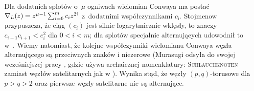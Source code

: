 Dla dodatnich splotów o~$\mu$ ogniwach wielomian Conwaya ma postać $\nabla_L(z) = z^{\mu-1} \sum_{i=0}^m c_i z^{2i}$ z~dodatnimi współczynnikami $c_i$.
Stojmenow przypuszcza, że ciąg $(c_i)$ jest silnie logarytmicznie wklęsły, to znaczy $c_{i-1} c_{i+1} < c_i^2$ dla $0 < i < m$; dla splotów specjalnie alternujących udowodnił to w~\cite[tw. 1]{stoimenowb2005}.
Wiemy natomiast, że kolejne współczynniki wielomianu Conwaya węzła alternującego są przeciwnych znaków i niezerowe (Murasugi \cite[s. 242]{murasugi1996} odsyła do swojej wcześniejszej pracy \cite{murasugi1959}, gdzie używa archaicznej nomenklatury: \textsc{Schlauchknoten} zamiast węzłów satelitarnych jak w \cite[s. 245]{schubert1953}).
%
Wynika stąd, że węzły $(p, q)$-torusowe dla $p > q > 2$ oraz pierwsze węzły satelitarne nie są alternujące.


